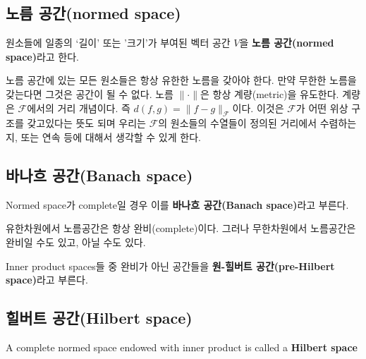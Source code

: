 \documentclass[b5paper,]{scrbook}
\theoremstyle{plain}
\theoremstyle{definition}
\numberwithin{equation}{section}
\let\BeginKnitrBlock\begin \let\EndKnitrBlock\end
\begin{document}
\subsection{노름 공간(normed space)}\label{-normed-space}

\BeginKnitrBlock{definition}[노름 공간]
\protect\hypertarget{def:unnamed-chunk-19}{}{\label{def:unnamed-chunk-19}
{} }원소들에 일종의 `길이' 또는 '크기'가 부여된
벡터 공간 \(V\)을 \textbf{노름 공간(normed space)}라고 한다.
\EndKnitrBlock{definition}

노름 공간에 있는 모든 원소들은 항상 유한한 노름을 갖아야 한다. 만약
무한한 노름을 갖는다면 그것은 공간이 될 수 없다. 노름 \(\|\cdot\|\)은
항상 계량(metric)을 유도한다. 계량은 \(\mathcal{F}\)에서의 거리
개념이다. 즉 \(d(f,g)=\| f-g\|_{\mathcal{F}}\)이다. 이것은
\(\mathcal{F}\)가 어떤 위상 구조를 갖고있다는 뜻도 되며 우리는
\(\mathcal{F}\)의 원소들의 수열들이 정의된 거리에서 수렴하는지, 또는
연속 등에 대해서 생각할 수 있게 한다.

\subsection{바나흐 공간(Banach space)}\label{-banach-space}

\BeginKnitrBlock{definition}[힐버트 공간]
\protect\hypertarget{def:unnamed-chunk-20}{}{\label{def:unnamed-chunk-20}
{} }Normed space가 complete일 경우 이를
\textbf{바나흐 공간(Banach space)}라고 부른다.
\EndKnitrBlock{definition}

유한차원에서 노름공간은 항상 완비(complete)이다. 그러나 무한차원에서
노름공간은 완비일 수도 있고, 아닐 수도 있다.

\BeginKnitrBlock{definition}[원-힐버트 공간]
\protect\hypertarget{def:unnamed-chunk-21}{}{\label{def:unnamed-chunk-21}
{} }Inner product spaces들 중 완비가 아닌
공간들을 \textbf{원-힐버트 공간(pre-Hilbert space)}라고 부른다.
\EndKnitrBlock{definition}

\subsection{힐버트 공간(Hilbert space)}\label{-hilbert-space}

\BeginKnitrBlock{definition}[힐버트 공간]
\protect\hypertarget{def:unnamed-chunk-22}{}{\label{def:unnamed-chunk-22}
{} }A complete normed space endowed with inner
product is called a \textbf{Hilbert space}
\EndKnitrBlock{definition}
\end{document}
